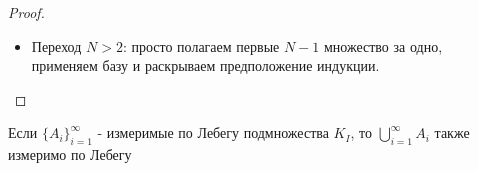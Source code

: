 \begin{proof}
\begin{itemize}
		\[
			|M_{1, \eps} \cup M_{2, \eps}| + |M_{1, \eps} \cap M_{2, \eps}| = |M_{1, \eps}| + |M_{2, \eps}|
		\]
		Нужно оценить пересечение, потому что на объединение неравенство написано уже выше:
		\begin{multline*}
			M_{1, \eps} \cap M_{2, \eps} \subset \big((M_{1, \eps} \tr A_1) \cup A_1\big) \cap \big((M_{2, \eps} \tr A_2) \cup A_2\big) =
			\\
			\Big(\big((M_{1, \eps} \tr A_1) \cup A_1\big) \cap (M_{2, \eps} \tr A_2)\Big) \cup \Big(\big((M_{1, \eps} \tr A_1) \cup A_1\big) \cap A_2\Big) =
			\\
			\Big(\big((M_{1, \eps} \tr A_1) \cup A_1\big) \cap (M_{2, \eps} \tr A_2)\Big) \cup \big((M_{1, \eps} \tr A_1) \cap A_2\big) \subset
			\\
			(M_{1, \eps} \tr A_1) \cup (M_{2, \eps} \tr A_2) \Lora |M_{1, \eps} \cap M_{2, \eps}| \le \jlm(M_{1, \eps} \tr A_1) + \jlm(M_{2, \eps} \tr A_2) < 2\eps
		\end{multline*}
		Отсюда рождается ещё один переход в неравенстве:
		\[
			\jlm(A_1) + \jlm(A_2) < |M_{1, \eps} \cup M_{2, \eps}| + 4\eps
		\]
		Используя неравенство с $|M_{1, \eps} \cup M_{2, \eps}|$ выше, получаем требуемое:
		\[
			(\forall \eps > 0) \emb\jlm(A_1) + \jlm(A_2) < \jlm(A_1 \sqcup A_2) + 6\eps
		\]
		
		\item Переход $N > 2$: просто полагаем первые $N - 1$ множество за одно, применяем базу и раскрываем предположение индукции.
	\end{itemize}
\end{proof}

\begin{theorem}
	Если $\{A_i\}_{i = 1}^\infty$ - измеримые по Лебегу подмножества $K_I$, то $\bigcup_{i = 1}^\infty A_i$ также измеримо по Лебегу
\end{theorem}

